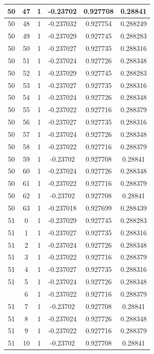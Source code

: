 \documentclass[12pt,a4paper]{article}
\numberwithin{equation}{section}
\numberwithin{figure}{section}
\numberwithin{table}{section}
\begin{document}
\begin{longtable}{|c|c|c|c|c|c|}
50 & 47 & 1 & -0.23702 & 0.927708 & 0.28841 \\ \hline
50 & 48 & 1 & -0.237032 & 0.927754 & 0.288249 \\ \hline
50 & 49 & 1 & -0.237029 & 0.927745 & 0.288283 \\ \hline
50 & 50 & 1 & -0.237027 & 0.927735 & 0.288316 \\ \hline
50 & 51 & 1 & -0.237024 & 0.927726 & 0.288348 \\ \hline
50 & 52 & 1 & -0.237029 & 0.927745 & 0.288283 \\ \hline
50 & 53 & 1 & -0.237027 & 0.927735 & 0.288316 \\ \hline
50 & 54 & 1 & -0.237024 & 0.927726 & 0.288348 \\ \hline
50 & 55 & 1 & -0.237022 & 0.927716 & 0.288379 \\ \hline
50 & 56 & 1 & -0.237027 & 0.927735 & 0.288316 \\ \hline
50 & 57 & 1 & -0.237024 & 0.927726 & 0.288348 \\ \hline
50 & 58 & 1 & -0.237022 & 0.927716 & 0.288379 \\ \hline
50 & 59 & 1 & -0.23702 & 0.927708 & 0.28841 \\ \hline
50 & 60 & 1 & -0.237024 & 0.927726 & 0.288348 \\ \hline
50 & 61 & 1 & -0.237022 & 0.927716 & 0.288379 \\ \hline
50 & 62 & 1 & -0.23702 & 0.927708 & 0.28841 \\ \hline
50 & 63 & 1 & -0.237018 & 0.927699 & 0.288439 \\ \hline
51 & 0 & 1 & -0.237029 & 0.927745 & 0.288283 \\ \hline
51 & 1 & 1 & -0.237027 & 0.927735 & 0.288316 \\ \hline
51 & 2 & 1 & -0.237024 & 0.927726 & 0.288348 \\ \hline
51 & 3 & 1 & -0.237022 & 0.927716 & 0.288379 \\ \hline
51 & 4 & 1 & -0.237027 & 0.927735 & 0.288316 \\ \hline
51 & 5 & 1 & -0.237024 & 0.927726 & 0.288348 \\ \hline
\pagebreak
51 & 6 & 1 & -0.237022 & 0.927716 & 0.288379 \\ \hline
51 & 7 & 1 & -0.23702 & 0.927708 & 0.28841 \\ \hline
51 & 8 & 1 & -0.237024 & 0.927726 & 0.288348 \\ \hline
51 & 9 & 1 & -0.237022 & 0.927716 & 0.288379 \\ \hline
51 & 10 & 1 & -0.23702 & 0.927708 & 0.28841 \\ \hline

\end{longtable}
\end{document}
